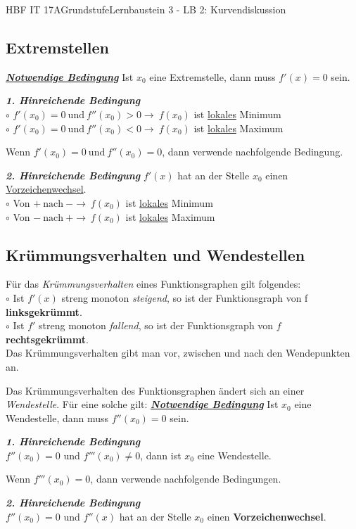 \documentclass[11pt,twocolumn,oneside,openany,headings=optiontotoc,11pt,numbers=noenddot]{article}
\begin{document}
\begin{worksheet}{HBF IT 17A}{Grundstufe}{Lernbaustein 3 - LB 2: Kurvendiskussion}
		\subsection*{Extremstellen} \underline{\textit{\textbf{Notwendige Bedingung}}} Ist \(x_0\) eine Extremstelle, dann muss \(f'(x) = 0\) sein.\\
		\par\noindent
		\textbf{\textit{1. Hinreichende Bedingung}}\\
		\(\circ\) \(f'(x_0)=0\ \text{und}\ f''(x_0) > 0 \rightarrow\ f(x_0)\) ist \underline{lokales} Minimum\\
		\(\circ\) \(f'(x_0)=0\ \text{und}\ f''(x_0) < 0 \rightarrow\ f(x_0)\) ist \underline{lokales} Maximum\\
		\par\noindent
		Wenn \(f'(x_0)=0\ \text{und}\ f''(x_0)=0\), dann verwende nachfolgende Bedingung.\\
		\par\noindent
		\textit{\textbf{2. Hinreichende Bedingung}} \(f'(x)\) hat an der Stelle \(x_0\) einen \underline{Vorzeichenwechsel}.\\
		\(\circ\) Von \(+\ \text{nach}\ - \rightarrow\ f(x_0)\) ist \underline{lokales} Minimum\\
		\(\circ\) Von \(-\ \text{nach}\ + \rightarrow\ f(x_0)\) ist \underline{lokales} Maximum\\
		\subsection*{Krümmungsverhalten und Wendestellen}
		Für das \textit{Krümmungsverhalten} eines Funktionsgraphen gilt folgendes:\\
		\(\circ\) Ist \(f'(x)\) streng monoton \textit{steigend}, so ist der Funktionsgraph von f \textbf{linksgekrümmt}.\\
		\(\circ\) Ist \(f'\) streng monoton \textit{fallend}, so ist der Funktionsgraph von \(f\) \textbf{rechtsgekrümmt}.\\
		\small{Das Krümmungsverhalten gibt man vor, zwischen und nach den Wendepunkten an.}\normalsize
		\par\noindent
		Das Krümmungsverhalten des Funktionsgraphen ändert sich an einer \textit{Wendestelle}. Für eine solche gilt:
		\textit{\underline{\textbf{Notwendige Bedingung}}} Ist \(x_0\) eine Wendestelle, dann muss \(f''(x_0)  = 0\) sein.\\
		\par\noindent
		\textbf{\textit{1. Hinreichende Bedingung}}\\
		\(f''(x_0)=0\) und \(f'''(x_0) \neq 0\), dann ist \(x_0\) eine Wendestelle.\\
		\par\noindent
		Wenn \(f'''(x_0)= 0\), dann verwende nachfolgende Bedingungen.\\
		\par\noindent
		\textbf{\textit{2. Hinreichende Bedingung}}\\\(f''(x_0)=0\) und \(f''(x)\) hat an der Stelle \(x_0\) einen \textbf{Vorzeichenwechsel}.\\

\end{worksheet}
\end{document}

